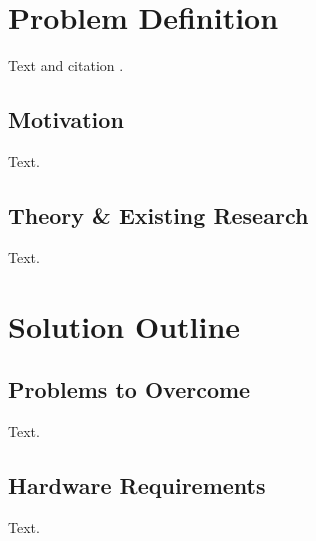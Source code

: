 \documentclass[a4paper, 12pt, english, conference]{IEEEtran}
\begin{document}
    \thispagestyle{noheader}

    \twocolumn[
        \begin{@twocolumnfalse}
            \topTitle
        \end{@twocolumnfalse}
    ]
    


    \section{Problem Definition}
        \label{sec: Problem Definition}
        
        Text and citation \cite{bibtex-reference-types}.
    

        \subsection{Motivation}
            \label{subsec: motivation}

            Text.


        \subsection{Theory \& Existing Research}
            \label{subsec: theory and existing research}

            Text.

    
    \section{Solution Outline}
        \label{sec: Solution Outline}

        \subsection{Problems to Overcome}
            \label{subsec: Problems to Overcome}

            Text.

            
        \subsection{Hardware Requirements}
            \label{subsec: Hardware Requirements}

            Text.
                
\end{document}
